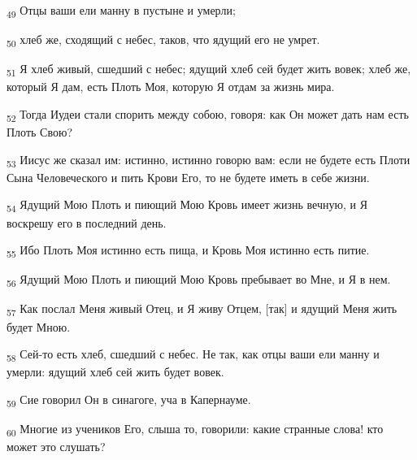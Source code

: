 \begin{tcolorbox}
\textsubscript{49} Отцы ваши ели манну в пустыне и умерли;
\end{tcolorbox}
\begin{tcolorbox}
\textsubscript{50} хлеб же, сходящий с небес, таков, что ядущий его не умрет.
\end{tcolorbox}
\begin{tcolorbox}
\textsubscript{51} Я хлеб живый, сшедший с небес; ядущий хлеб сей будет жить вовек; хлеб же, который Я дам, есть Плоть Моя, которую Я отдам за жизнь мира.
\end{tcolorbox}
\begin{tcolorbox}
\textsubscript{52} Тогда Иудеи стали спорить между собою, говоря: как Он может дать нам есть Плоть Свою?
\end{tcolorbox}
\begin{tcolorbox}
\textsubscript{53} Иисус же сказал им: истинно, истинно говорю вам: если не будете есть Плоти Сына Человеческого и пить Крови Его, то не будете иметь в себе жизни.
\end{tcolorbox}
\begin{tcolorbox}
\textsubscript{54} Ядущий Мою Плоть и пиющий Мою Кровь имеет жизнь вечную, и Я воскрешу его в последний день.
\end{tcolorbox}
\begin{tcolorbox}
\textsubscript{55} Ибо Плоть Моя истинно есть пища, и Кровь Моя истинно есть питие.
\end{tcolorbox}
\begin{tcolorbox}
\textsubscript{56} Ядущий Мою Плоть и пиющий Мою Кровь пребывает во Мне, и Я в нем.
\end{tcolorbox}
\begin{tcolorbox}
\textsubscript{57} Как послал Меня живый Отец, и Я живу Отцем, [так] и ядущий Меня жить будет Мною.
\end{tcolorbox}
\begin{tcolorbox}
\textsubscript{58} Сей-то есть хлеб, сшедший с небес. Не так, как отцы ваши ели манну и умерли: ядущий хлеб сей жить будет вовек.
\end{tcolorbox}
\begin{tcolorbox}
\textsubscript{59} Сие говорил Он в синагоге, уча в Капернауме.
\end{tcolorbox}
\begin{tcolorbox}
\textsubscript{60} Многие из учеников Его, слыша то, говорили: какие странные слова! кто может это слушать?
\end{tcolorbox}

